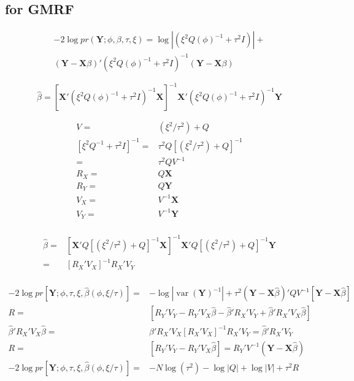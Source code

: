 \documentclass[12pt]{article}
\DeclareMathOperator{\var}{var}
\begin{document}
\subsection{for GMRF}
\begin{multline*}
-2 \log pr(\mathbf{Y};\phi,\beta,\tau,\xi) =
\log| (\xi^2  Q(\phi)^{-1} + \tau^2 I  ) | + \\
( \mathbf{Y} -\mathbf{X}\beta)  '
  (\xi^2  Q(\phi)^{-1} + \tau^2 I  )^{-1}
(\mathbf{Y} - \mathbf{X}\beta)
\end{multline*}

\[
\hat\beta = [ \mathbf{X}'
(  \xi^2  Q(\phi)^{-1} + \tau^2 I )^{-1}   \mathbf{X}]^{-1}
\mathbf{X}'(\xi^2  Q(\phi)^{-1} +
\tau^2 I  )^{-1} \mathbf{Y}
\]



\begin{align*}
V = & (\xi^2/\tau^2) + Q\\
[\xi^2 Q^{-1} + \tau^2 I]^{-1}= & \tau^2 Q [(\xi^2/\tau^2) + Q]^{-1} \\
= & \tau^2 Q V^{-1}\\
R_X =& Q \mathbf{X}\\
R_Y =& Q \mathbf{Y}\\
V_X = &V^{-1} \mathbf{X}\\
V_Y =& V^{-1} \mathbf{Y}\\
\end{align*}


\begin{align*}
\hat\beta =  &[ \mathbf{X}'
 Q [(\xi^2/\tau^2) + Q]^{-1}  \mathbf{X}]^{-1}
\mathbf{X}' Q [(\xi^2/\tau^2) + Q]^{-1}  \mathbf{Y}\\
= & [ R_X' V_X ]^{-1}  R_X' V_Y\\
\end{align*}


\begin{align*}
-2 \log pr[\mathbf{Y};\phi,\tau, \xi ,\hat\beta(\phi, \xi/\tau)] = &
-\log |\var(\mathbf{Y})^{-1}| + \tau^2 ( \mathbf{Y} -\mathbf{X}\hat\beta) '
  Q V^{-1} 
 [\mathbf{Y} - \mathbf{X}\hat\beta ] \\
R=&  [R_Y' V_Y - R_Y' V_X \hat\beta - \hat\beta ' R_X' V_Y + \hat\beta 'R_X'
V_X \hat\beta ] \\
\hat\beta 'R_X'
V_X \hat\beta = &  \hat\beta' R_X' V_X [ R_X' V_X ]^{-1}  R_X' V_Y =
 \hat\beta ' R_X' V_Y   \\
R = &[R_Y' V_Y - R_Y' V_X \hat\beta] = R_Y' V^{-1} ( \mathbf{Y} -
\mathbf{X}\hat\beta)\\
-2 \log pr[\mathbf{Y};\phi,\tau, \xi ,\hat\beta(\phi, \xi/\tau)] =& -N \log (\tau^2) -\log|Q| + \log|V| +  \tau^2 R\\
\end{align*}
\end{document}
